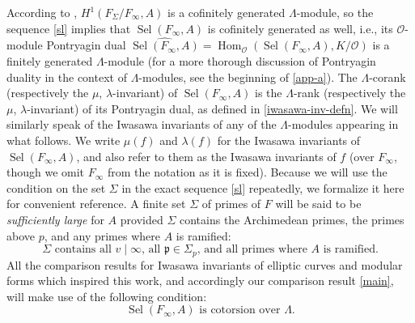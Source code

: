\documentclass[12 pt]{amsart}
\theoremstyle{plain}
\theoremstyle{definition}
\numberwithin{equation}{section}
\numberwithin{table}{section}
\begin{document}
According to \cite[Proposition 3]{GR89}, $H^1(F_\Sigma/F_\infty,A)$ is a cofinitely generated $\Lambda$-module, so the sequence \cref{sl} implies that $\operatorname{Sel}(F_\infty,A)$ is cofinitely generated as well, i.e., its $\mathscr{O}$-module Pontryagin dual $\widehat{\operatorname{Sel}(F_\infty,A)}=\operatorname{Hom}_\mathscr{O}(\operatorname{Sel}(F_\infty,A),K/\mathscr{O})$ is a finitely generated $\Lambda$-module (for a more thorough discussion of Pontryagin duality in the context of $\Lambda$-modules, see the beginning of \cref{app-a}). The $\Lambda$-corank (respectively the $\mu$, $\lambda$-invariant) of $\operatorname{Sel}(F_\infty,A)$ is the $\Lambda$-rank (respectively the $\mu$, $\lambda$-invariant) of its Pontryagin dual, as defined in \cref{iwasawa-inv-defn}. We will similarly speak of the Iwasawa invariants of any of the $\Lambda$-modules appearing in what follows. We write $\mu(f)$ and $\lambda(f)$ for the Iwasawa invariants of $\operatorname{Sel}(F_\infty,A)$, and also refer to them as the Iwasawa invariants of $f$ (over $F_\infty$, though we omit $F_\infty$ from the notation as it is fixed). Because we will use the condition on the set $\Sigma$ in the exact sequence \cref{sl} repeatedly, we formalize it here for convenient reference. A finite set $\Sigma$ of primes of $F$ will be said to be \emph{sufficiently large} for $A$ provided $\Sigma$ contains the Archimedean primes, the primes above $p$, and any primes where $A$ is ramified:
\begin{equation}
\label{Suff}\tag{Suff} \text{$\Sigma$ contains all $v\mid\infty$, all $\mathfrak{p}\in\Sigma_p$, and all primes where $A$ is ramified.}
\end{equation}
\indent All the comparison results for Iwasawa invariants of elliptic curves and modular forms which inspired this work, and accordingly our comparison result \cref{main}, will make use of the following condition:
\begin{equation}
\label{HA}
\tag{Cot}
\operatorname{Sel}(F_\infty,A)\text{ is cotorsion over }\Lambda\text{.}
\end{equation}
\end{document}
